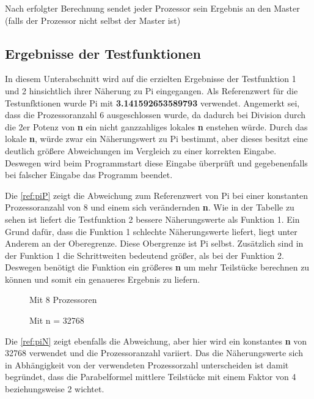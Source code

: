 Nach erfolgter Berechnung sendet jeder Prozessor sein Ergebnis an den Master (falls der Prozessor nicht selbst der Master ist)

\subsection{Ergebnisse der Testfunktionen}
In diesem Unterabschnitt wird auf die erzielten Ergebnisse der Testfunktion 1 und 2 hinsichtlich ihrer Näherung zu Pi eingegangen.
Als Referenzwert für die Testunfktionen wurde Pi mit \textbf{3.141592653589793} verwendet.
Angemerkt sei, dass die Prozessoranzahl 6 ausgeschlossen wurde, da dadurch bei Division durch die 2er Potenz von \textbf{n} ein nicht ganzzahliges lokales \textbf{n} enstehen würde.
Durch das lokale \textbf{n}, würde zwar ein Näherungswert zu Pi bestimmt, aber dieses besitzt eine deutlich größere Abweichungen im Vergleich zu einer korrekten Eingabe.
Deswegen wird beim Programmstart diese Eingabe überprüft und gegebenenfalls bei falscher Eingabe das Programm beendet.

Die \autoref{ref:piP} zeigt die Abweichung zum Referenzwert von Pi bei einer konstanten Prozessoranzahl von 8 und einem sich verändernden \textbf{n}.
Wie in der Tabelle zu sehen ist liefert die Testfunktion 2 bessere Näherungswerte als Funktion 1.
Ein Grund dafür, dass die Funktion 1 schlechte Näherungswerte liefert, liegt unter Anderem an der Oberegrenze.
Diese Obergrenze ist Pi selbst.
Zusätzlich sind in der Funktion 1 die Schrittweiten bedeutend größer, als bei der Funktion 2.
Deswegen benötigt die Funktion ein größeres \textbf{n} um mehr Teilstücke berechnen zu können und somit ein genaueres Ergebnis zu liefern.
\begin{figure}[h]
\begin{minipage}{0.45\textwidth}
	\caption{Mit 8 Prozessoren}
	\label{ref:piP}
\end{minipage}
\hfill
\begin{minipage}{0.45\textwidth}
	\caption{Mit n = 32768}
	\label{ref:piN}
\end{minipage}
\end{figure}
Die \autoref{ref:piN} zeigt ebenfalls die Abweichung, aber hier wird ein konstantes \textbf{n} von 32768 verwendet und die Prozessoranzahl variiert.
Das die Näherungswerte sich in Abhängigkeit von der verwendeten Prozessorzahl unterscheiden ist damit begründet, dass die Parabelformel mittlere Teilstücke mit einem Faktor von 4 beziehungsweise 2 wichtet.

